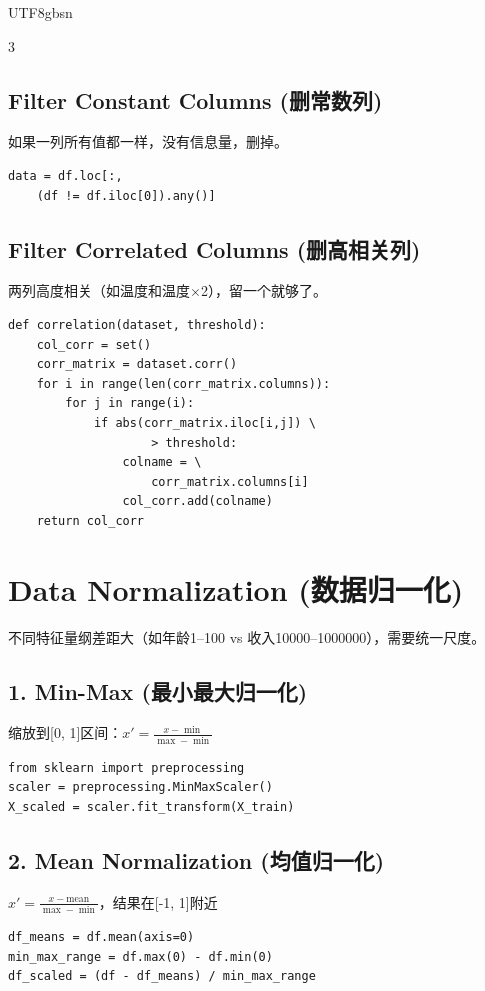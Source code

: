 \documentclass[10pt,landscape,a4paper]{article}
\newcommand{\zhint}[1]{{\scriptsize\color{gray!70!black}#1}}
\begin{document}
\begin{CJK}{UTF8}{gbsn}
\begin{multicols}{3}
\subsection{Filter Constant Columns \zhint{(删常数列)}}
\zhint{如果一列所有值都一样，没有信息量，删掉。}
\begin{lstlisting}
data = df.loc[:,
    (df != df.iloc[0]).any()]
\end{lstlisting}

\subsection{Filter Correlated Columns \zhint{(删高相关列)}}
\zhint{两列高度相关（如温度和温度$\times$2），留一个就够了。}
\begin{lstlisting}
def correlation(dataset, threshold):
    col_corr = set()
    corr_matrix = dataset.corr()
    for i in range(len(corr_matrix.columns)):
        for j in range(i):
            if abs(corr_matrix.iloc[i,j]) \
                    > threshold:
                colname = \
                    corr_matrix.columns[i]
                col_corr.add(colname)
    return col_corr
\end{lstlisting}

\section{Data Normalization \zhint{(数据归一化)}}

\zhint{不同特征量纲差距大（如年龄1--100 vs 收入10000--1000000），需要统一尺度。}

\subsection{1. Min-Max \zhint{(最小最大归一化)}}
\zhint{缩放到[0, 1]区间：$x' = \frac{x - \min}{\max - \min}$}
\begin{lstlisting}
from sklearn import preprocessing
scaler = preprocessing.MinMaxScaler()
X_scaled = scaler.fit_transform(X_train)
\end{lstlisting}

\subsection{2. Mean Normalization \zhint{(均值归一化)}}
\zhint{$x' = \frac{x - \text{mean}}{\max - \min}$，结果在[-1, 1]附近}
\begin{lstlisting}
df_means = df.mean(axis=0)
min_max_range = df.max(0) - df.min(0)
df_scaled = (df - df_means) / min_max_range
\end{lstlisting}


\end{multicols}
\end{CJK}
\end{document}
